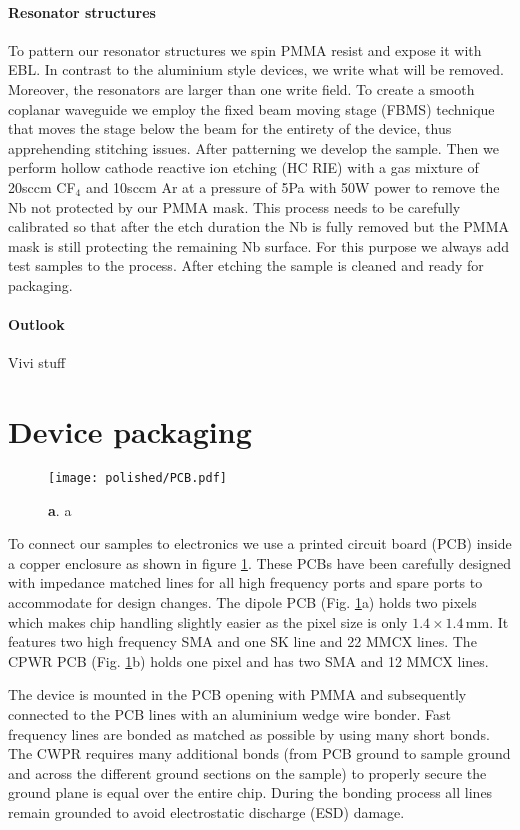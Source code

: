 \paragraph*{Resonator structures}
To pattern our resonator structures we spin PMMA resist and expose it with EBL. In contrast to the aluminium style devices, we write what will be removed. Moreover, the resonators are larger than one write field. To create a smooth coplanar waveguide we employ the fixed beam moving stage (FBMS) technique that moves the stage below the beam for the entirety of the device, thus apprehending stitching issues. After patterning we develop the sample. Then we perform hollow cathode reactive ion etching (HC RIE) with a gas mixture of 20sccm CF$_4$ and 10sccm Ar at a pressure of 5Pa with 50W power to remove the Nb not protected by our PMMA mask. This process needs to be carefully calibrated so that after the etch duration the Nb is fully removed but the PMMA mask is still protecting the remaining Nb surface. For this purpose we always add test samples to the process. After etching the sample is cleaned and ready for packaging. 

\paragraph*{Outlook}
Vivi stuff


\section{Device packaging} \label{sec:packaging}

\begin{figure}
	\centering
	\texttt{[image: polished/PCB.pdf]}
	\caption[PCB]{\textbf{a}. a }
	\label{fig:pcb}
\end{figure}

To connect our samples to electronics we use a printed circuit board (PCB) inside a copper enclosure as shown in figure \ref{fig:pcb}. These PCBs have been carefully designed with impedance matched lines for all high frequency ports and spare ports to accommodate for design changes. The dipole PCB (Fig. \ref{fig:pcb}a) holds two pixels which makes chip handling slightly easier as the pixel size is only $1.4\times1.4\,$mm. It features two high frequency SMA
and one SK line and 22 MMCX lines. The CPWR PCB (Fig. \ref{fig:pcb}b) holds one pixel and has two SMA and 12 MMCX lines. 

The device is mounted in the PCB opening with PMMA and subsequently connected to the PCB lines with an aluminium wedge wire bonder. Fast frequency lines are bonded as matched as possible by using many short bonds. The CWPR requires many additional bonds (from PCB ground to sample ground and across the different ground sections on the sample) to properly secure the ground plane is equal over the entire chip. During the bonding process all lines remain grounded to avoid electrostatic discharge (ESD) damage. 

